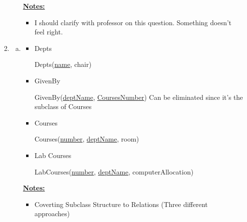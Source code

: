 \documentclass[12pt]{article}
\begin{document}
\begin{enumerate}[1.]
\begin{enumerate}[a)]
        \underline{\textbf{Notes:}}

        \begin{itemize}
            \item I should clarify with professor on this question. Something doesn't feel right.
        \end{itemize}
    \end{enumerate}

    \item

    \begin{enumerate}[a)]

        \item

        \begin{itemize}
            \item Depts

            \bigskip

            \quad Depts(\underline{name}, chair)

            \bigskip

            \item GivenBy

            \bigskip

            \quad GivenBy(\underline{deptName}, \underline{CoursesNumber}) \color{red}Can be eliminated since it's the subclass of Courses\color{black}

            \bigskip

            \item Courses

            \bigskip

            \quad Courses(\underline{number}, \underline{deptName}, room)

            \bigskip

            \item Lab Courses

            \bigskip

            \quad LabCourses(\underline{number}, \underline{deptName}, computerAllocation)

            \bigskip

        \end{itemize}

        \bigskip

        \underline{\textbf{Notes:}}

        \bigskip

        \begin{itemize}
            \item Coverting Subclass Structure to Relations (Three different approaches)


\end{itemize}
\end{enumerate}
\end{enumerate}
\end{document}
